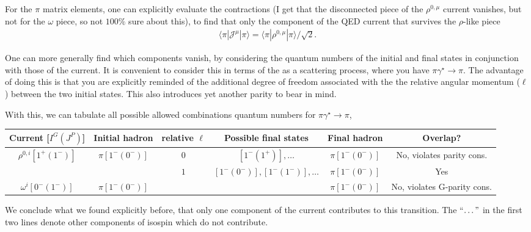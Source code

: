 For the $\pi$ matrix elements, one can explicitly evaluate the contractions {\raul (I get that the disconnected piece of the $\rho^{0,\mu}$ current vanishes, but not for the $\omega$ piece, so not $100\%$ sure about this)}, to find that only the component of the QED current that survives the $\rho$-like piece
\begin{align}
\langle\pi|{\mathcal{J}}^{\mu}|\pi\rangle=
\langle\pi|\rho^{0,\mu}|\pi\rangle/\sqrt{2}.
\end{align}

One can more generally find which components vanish, by considering the quantum numbers of the initial and final states in conjunction with those of the current. It is convenient to consider this in terms of the as a scattering process, where you have $\pi\gamma^\star\to\pi$. The advantage of doing this is that you are explicitly reminded of the additional degree of freedom associated with the the relative angular momentum ($\ell$) between the two initial states. This also introduces yet another parity to bear in mind. 


With this, we can tabulate all possible allowed combinations quantum numbers for  $\pi\gamma^\star\to\pi$,
\begin{center}
 \begin{tabular}{ |c | c | c |c|c| c|} 
\hline
Current [$I^G(J^{P})$]
& 
Initial hadron
&
relative $\ell$
&
Possible final states
& 
Final hadron
& 
Overlap?
\\\hline
$\rho^{0,i}[1^{+}(1^{-})]$
&
$\pi[1^{-}(0^{-})]$
&
$0$
&
$[1^{-}(1^{+})],\ldots$
&
$\pi[1^{-}(0^{-})]$
&No, violates parity cons.
\\
&
&
$1$
&
$[1^{-}(0^{-})],[1^{-}(1^{-})],\ldots$
&
$\pi[1^{-}(0^{-})]$
& Yes
\\\hline
$\omega^{i}[0^{-}(1^{-})]$
&
$\pi[1^{-}(0^{-})]$
&
&
&
$\pi[1^{-}(0^{-})]$
&No, violates G-parity cons. 
\vspace{.05cm}\\ \hline
\end{tabular}
 \end{center}
We conclude what we found explicitly before, that only one component of the current contributes to this transition. The ``$\ldots"$ in the first two lines denote other components of isospin which do not contribute. 

 

